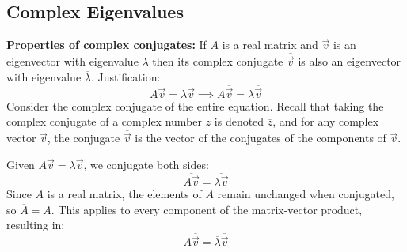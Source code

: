 \subsection{Complex Eigenvalues}

\textbf{Properties of complex conjugates:}
If $A$ is a real matrix and $\vec{v}$ is an eigenvector with eigenvalue $\lambda$ then its complex conjugate $\overline{\vec{v}}$ is also an eigenvector with eigenvalue $\overline{\lambda}$.
Justification:
\[
    A\vec{v} = \lambda \vec{v} \implies A\overline{\vec{v}} = \overline{\lambda} \overline{\vec{v}}
\]
Consider the complex conjugate of the entire equation. Recall that taking the complex conjugate of a complex number \( z \) is denoted \( \overline{z} \), and for any complex vector \( \vec{v} \), the conjugate \( \overline{\vec{v}} \) is the vector of the conjugates of the components of \( \vec{v} \).

Given \( A \vec{v} = \lambda \vec{v} \), we conjugate both sides:
\[
\overline{A \vec{v}} = \overline{\lambda \vec{v}}
\]
Since \( A \) is a real matrix, the elements of \( A \) remain unchanged when conjugated, so \( \overline{A} = A \). This applies to every component of the matrix-vector product, resulting in:
\[
A \overline{\vec{v}} = \overline{\lambda} \overline{\vec{v}}
\]


